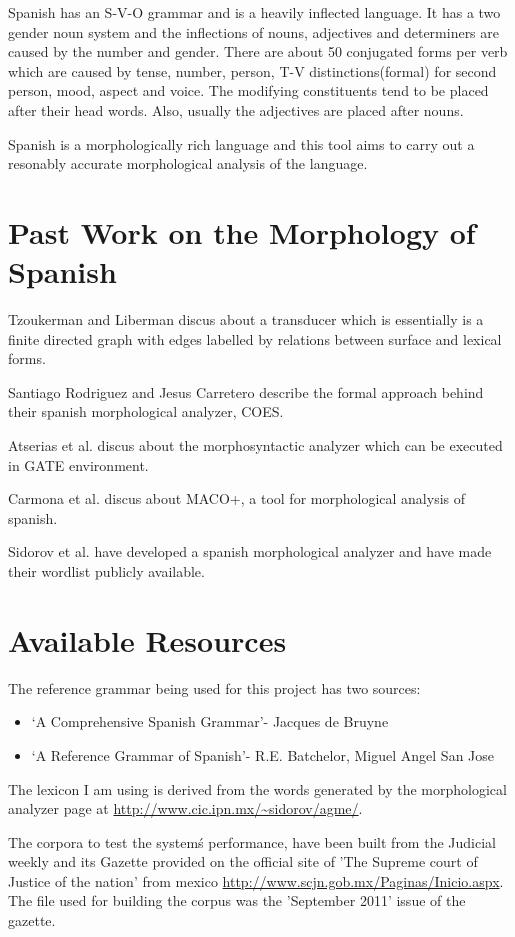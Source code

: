 \documentclass[11pt,letterpaper]{article}
\begin{document}
Spanish has an S-V-O grammar and is a heavily inflected language. It has a two gender noun system and the inflections of nouns, adjectives and determiners are caused by the number and gender. There are about 50 conjugated forms per verb which are caused by tense, number, person, T-V distinctions(formal) for second person, mood, aspect and voice. The modifying constituents tend to be placed after their head words. Also, usually the adjectives are placed after nouns.

Spanish is a morphologically rich language and this tool aims to carry out a resonably accurate morphological analysis of the language. 

 

\section{Past Work on the Morphology of Spanish}

Tzoukerman and Liberman discus about a transducer which is essentially is a finite directed graph with edges labelled by relations between surface and lexical forms. 

Santiago Rodriguez and Jesus Carretero describe the formal approach behind their spanish morphological analyzer, COES. 

Atserias et al. discus about the morphosyntactic analyzer which can be executed in GATE environment.

Carmona et al. discus about MACO+, a tool for morphological analysis of spanish.

Sidorov et al. have developed a spanish morphological analyzer and have made their wordlist publicly available.

\section{Available Resources}

The reference grammar being used for this project has two sources:
\begin{itemize}
\item
`A Comprehensive Spanish Grammar'- Jacques de Bruyne
\item
`A Reference Grammar of Spanish'- R.E. Batchelor, Miguel Angel San Jose
\end{itemize}
The lexicon I am using is derived from the words generated by the morphological analyzer page at \url{http://www.cic.ipn.mx/~sidorov/agme/}.

The corpora to test the systemś performance, have been built from the Judicial weekly and its Gazette provided on the official site of 'The Supreme court of Justice of the nation' from mexico \url{http://www.scjn.gob.mx/Paginas/Inicio.aspx}. The file used for building the corpus was the 'September 2011' issue of the gazette.
\end{document}
